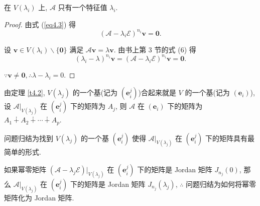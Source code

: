\documentclass[color=black,device=normal,lang=cn,mode=geye]{elegantnote}
\begin{document}
\begin{corollary}
    在 $V(\lambda_i)$ 上, $\mathcal{A}$ 只有一个特征值 $\lambda_i$.
\end{corollary}
\begin{proof}
    由式 (\ref{eq4.3}) 得
    \[(\mathcal{A}-\lambda_i\mathcal{E})^{n_i}\boldsymbol{v}=\boldsymbol{0}.\]

    设 $\boldsymbol{v}\in V(\lambda_i)\backslash\{\boldsymbol{0}\}$ 满足 $\mathcal{A}\boldsymbol{v}=\lambda\boldsymbol{v}$. 由书上第 3 节的式 (6) 得
    \[(\lambda_i-\lambda)^{n_i}\boldsymbol{v}=(\mathcal{A}-\lambda_i\mathcal{E})^{n_i}\boldsymbol{v}=\boldsymbol{0}.\]

    $\because\boldsymbol{v}\neq\boldsymbol{0},\therefore\lambda-\lambda_i=0$.
\end{proof}

由定理 \ref{t4.2}, $V(\lambda_j)$ 的一个基(记为 $(\boldsymbol{e}^j_i)$)合起来就是 $V$ 的一个基(记为 $(\boldsymbol{e}_i)$), 设 $\mathcal{A}|_{V(\lambda_j)}$ 在 $(\boldsymbol{e}^j_i)$ 下的矩阵为 $A_j$, 则 $\mathcal{A}$ 在 $(\boldsymbol{e}_i)$ 下的矩阵为 $A_1\dotplus A_2\dotplus\cdots\dotplus A_p$.

问题归结为找到 $V(\lambda_j)$ 的一个基 $(\boldsymbol{e}^j_i)$ 使得 $\mathcal{A}|_{V(\lambda_j)}$ 在 $(\boldsymbol{e}^j_i)$ 下的矩阵具有最简单的形式.

如果幂零矩阵 $(\mathcal{A}-\lambda_j\mathcal{E})|_{V(\lambda_j)}$ 在 $(\boldsymbol{e}^j_i)$ 下的矩阵是 Jordan 矩阵 $J_{n_j}(0)$, 那么 $\mathcal{A}|_{V(\lambda_j)}$ 在 $(\boldsymbol{e}^j_i)$ 下的矩阵是 Jordan 矩阵 $J_{n_j}(\lambda_j)$, $\therefore$ 问题归结为如何将幂零矩阵化为 Jordan 矩阵.
\end{document}
